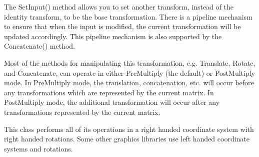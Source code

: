 The Set\-Input() method allows you to set another transform, instead of the identity transform, to be the base transformation. There is a pipeline mechanism to ensure that when the input is modified, the current transformation will be updated accordingly. This pipeline mechanism is also supported by the Concatenate() method. 

Most of the methods for manipulating this transformation, e.\-g. Translate, Rotate, and Concatenate, can operate in either Pre\-Multiply (the default) or Post\-Multiply mode. In Pre\-Multiply mode, the translation, concatenation, etc. will occur before any transformations which are represented by the current matrix. In Post\-Multiply mode, the additional transformation will occur after any transformations represented by the current matrix. 

This class performs all of its operations in a right handed coordinate system with right handed rotations. Some other graphics libraries use left handed coordinate systems and rotations.

